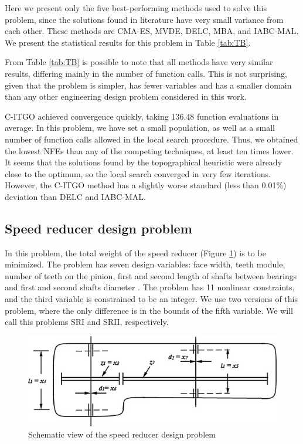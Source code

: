 Here we present only the five best-performing methods used to solve this problem, since the solutions found in literature have very small variance from each other. These methods are CMA-ES, MVDE, DELC, MBA, and IABC-MAL. We present the statistical results for this problem in Table \ref{tab:TB}.



From Table \ref{tab:TB} is possible to note that all methods have very similar results, differing mainly in the number of function calls. This is not surprising, given that the problem is simpler, has fewer variables and has a smaller domain than any other engineering design problem considered in this work.

C-ITGO achieved convergence quickly, taking 136.48 function evaluations in average. In this problem, we have set a small population, as well as a small number of function calls allowed in the local search procedure. Thus, we obtained the lowest NFEs than any of the competing techniques, at least ten times lower. It seems that the solutions found by the topographical heuristic were already close to the optimum, so the local search converged in very few iterations. However, the C-ITGO method has a slightly worse standard (less than 0.01\%) deviation than DELC and IABC-MAL.





\subsection{Speed reducer design problem}

In this problem, the total weight of the speed reducer (Figure \ref{fig:SR}) is to be minimized. The problem has seven design variables: face width, teeth module, number of teeth on the pinion, first and second length of shafts between bearings and first and second shafts diameter \citep{SR}. The problem has 11 nonlinear constraints, and the third variable is constrained to be an integer. We use two versions of this problem, where the only difference is in the bounds of the fifth variable. We will call this problems SRI and SRII, respectively.


\begin{figure}[h]
\begin{center}
\includegraphics[scale=0.6]{Imgs/SR.jpg}
\end{center}
\captionsetup{justification=centering}
\caption{Schematic view of the speed reducer design problem}\label{fig:SR}
\end{figure}

